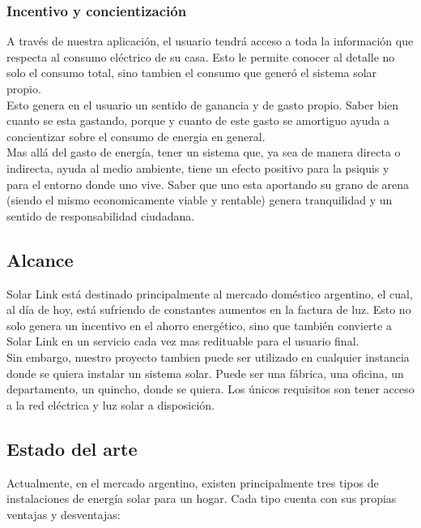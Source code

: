 \subsubsection{Incentivo y concientización}

A través de nuestra aplicación, el usuario tendrá acceso a toda la información que respecta al consumo eléctrico de su casa. Esto le permite conocer al detalle no solo el consumo total, sino tambien el consumo que generó el sistema solar propio.\\

Esto genera en el usuario un sentido de ganancia y de gasto propio. Saber bien cuanto se esta gastando, porque y cuanto de este gasto se amortiguo ayuda a concientizar sobre el consumo de energia en general. \\

Mas allá del gasto de energía, tener un sistema que, ya sea de manera directa o indirecta, ayuda al medio ambiente, tiene un efecto positivo para la psiquis y para el entorno donde uno vive. Saber que uno esta aportando su grano de arena (siendo el mismo economicamente viable y rentable) genera tranquilidad y un sentido de responsabilidad ciudadana. \\

\subsection{Alcance}

Solar Link está destinado principalmente al mercado doméstico argentino, el cual, al día de hoy, está sufriendo de constantes aumentos en la factura de luz. Esto no solo genera un incentivo en el ahorro energético, sino que también convierte a Solar Link en un servicio cada vez mas redituable para el usuario final. \\

Sin embargo, nuestro proyecto tambien puede ser utilizado en cualquier instancia donde se quiera instalar un sistema solar. Puede ser una fábrica, una oficina, un departamento, un quincho, donde se quiera. Los únicos requisitos son tener acceso a la red eléctrica y luz solar a disposición.\\

\subsection{Estado del arte}

Actualmente, en el mercado argentino, existen principalmente tres tipos de instalaciones de energía solar para un hogar. Cada tipo cuenta con sus propias ventajas y desventajas:\\

